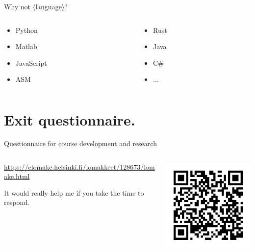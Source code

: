 \documentclass[11pt, aspectratio=169, table]{beamer}
\begin{document}
\begin{frame}{Why not $\langle$language$\rangle$?}
\begin{columns}
\begin{column}{0.5\textwidth}
\begin{itemize}
	\item Python
	\item Matlab
	\item JavaScript
	\item ASM
\end{itemize}
\end{column}
\begin{column}{0.5\textwidth}
\begin{itemize}
	\item Rust
	\item Java
	\item C\#
	\item ...
\end{itemize}
\end{column}
\end{columns}
\end{frame}

\section{Exit questionnaire.}
\begin{frame}{Questionnaire for course development and research}
\begin{columns}
\begin{column}{0.4\textwidth}
\setlength\parskip{1em}
\url{https://elomake.helsinki.fi/lomakkeet/128673/lomake.html}

It would really help me if you take the time to respond.
\end{column}
\begin{column}{0.6\textwidth}
\begin{center}
\includegraphics[width=0.5\columnwidth]{elomakeqr}
\end{center}
\end{column}
\end{columns}
\end{frame}
\end{document}
